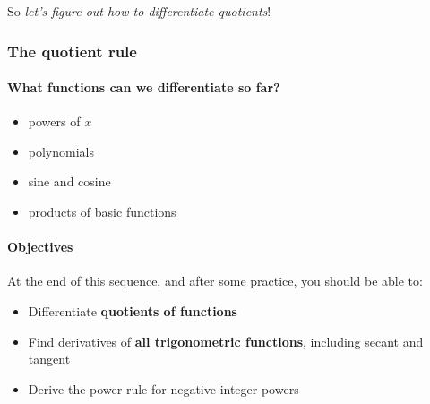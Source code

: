 \documentclass[pdftex, brazil, 12pt, twoside]{article}
\begin{document}
\begin{figure}[H]
  \begin{center}
  \end{center}
\end{figure}

So \emph{let's figure out how to differentiate quotients}!

\subsubsection{The quotient rule}
\label{u2-quotient-rule-objs}

\paragraph{What functions can we differentiate so far?}
\begin{itemize}[noitemsep]
\item powers of $x$
\item polynomials
\item sine and cosine
\item products of basic functions
\end{itemize}

\paragraph{Objectives}
At the end of this sequence, and after some practice, you should be able to:
\begin{itemize}[noitemsep]
\item Differentiate \textbf{quotients of functions}
\item Find derivatives of \textbf{all trigonometric functions}, including secant and tangent
\item Derive the power rule for negative integer powers
\end{itemize}
\end{document}
